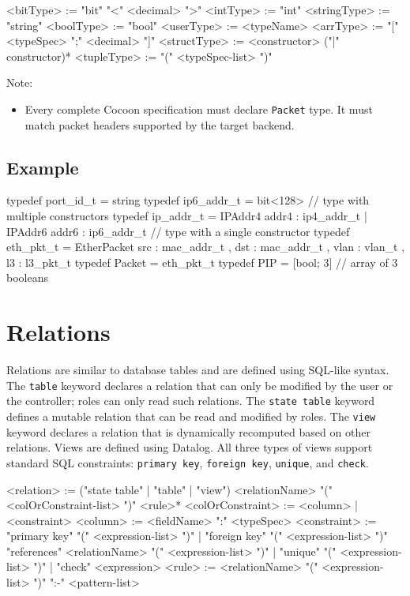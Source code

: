 \documentclass{report}
\newcommand{\src}[1]{\texttt{#1}}
\begin{document}
\begin{bnflisting}{}
<bitType>    := "bit" "<" <decimal> ">"
<intType>    := "int"
<stringType> := "string"
<boolType>   := "bool"
<userType>   := <typeName>
<arrType>    := "[" <typeSpec> ";" <decimal> "]"
<structType> := <constructor> ("|" constructor)* 
<tupleType>  := "(" <typeSpec-list> ")"
\end{bnflisting}

Note:
\begin{itemize}
    \item Every complete Cocoon specification must declare \src{Packet} type.
        It must match packet headers supported by the target backend.
\end{itemize}

\subsection*{Example}

\begin{ccnlisting}{}
typedef port_id_t  = string
typedef ip6_addr_t = bit<128>
// type with multiple constructors
typedef ip_addr_t  = IPAddr4 {addr4 : ip4_addr_t}
                   | IPAddr6 {addr6 : ip6_addr_t}
// type with a single constructor
typedef eth_pkt_t = EtherPacket { src  : mac_addr_t
                                , dst  : mac_addr_t
                                , vlan : vlan_t
                                , l3   : l3_pkt_t}
typedef Packet = eth_pkt_t
typedef PIP = [bool; 3] // array of 3 booleans
\end{ccnlisting}

\section{Relations}

Relations are similar to database tables and are defined using SQL-like
syntax. The \src{table} keyword declares a relation that can only
be modified by the user or the controller; roles can only read such
relations.  The \src{state table} keyword defines a mutable relation 
that can be read and modified by roles.  The \src{view}
keyword declares a relation that is dynamically recomputed based on
other relations.  Views are defined using Datalog.  All three types of
views support standard SQL constraints: \src{primary key},
\src{foreign key}, \src{unique}, and \src{check}. 

\begin{bnflisting}{}
<relation> := ("state table" | "table" | "view") <relationName> 
             "(" <colOrConstraint-list> ")"
             <rule>* 
<colOrConstraint> := <column> | <constraint>
<column> := <fieldName> ":" <typeSpec>
<constraint> := "primary key" "(" <expression-list> ")"
              | "foreign key"  "(" <expression-list> ")" 
                         "references" <relationName> "(" <expression-list> ")"
              | "unique" "(" <expression-list> ")"
              | "check" <expression>
<rule> := <relationName> "(" <expression-list> ")" 
          ":-" <pattern-list> 
\end{bnflisting}
\end{document}
